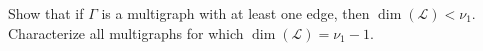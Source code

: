 Show that if $\Gamma$ is a multigraph with at least one edge, then $\dim(\mathcal{L}) < \nu_1$. Characterize all multigraphs for which $\dim(\mathcal{L}) = \nu_1 - 1$.